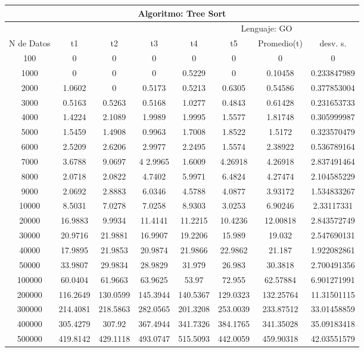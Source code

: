 \documentclass{article}
\begin{document}
	\begin{table}[]
        \begin{tabular}{|c|c|c|c|c|c|c|c| }
            \hline
            \multicolumn{8}{|c|}{Algoritmo: Tree Sort} \\ \hline
            \multicolumn{4}{|c|}{} & \multicolumn{4}{c|}{Lenguaje: GO} \\ \hline
              N de Datos &     t1    &  t2         &  t3          &   t4        &    t5     &   Promedio(t)       & desv. s. \\ \hline
100	    &0	    &0	    &0	        &0	    &0	    &0	      &0              \\ \hline
1000	&0	    &0	    &0	        & 0.5229&0	    &0.10458  &0.233847989     \\ \hline
2000	&1.0602	&0	    & 0.5173	&0.5213	&0.6305	&0.54586  &0.377853004\\ \hline
3000	&0.5163	&0.5263	& 0.5168	&1.0277	&0.4843	&0.61428  &0.231653733\\ \hline
4000	&1.4224	&2.1089	& 1.9989	&1.9995	&1.5577	&1.81748  &0.305999987\\ \hline
5000	&1.5459	&1.4908	& 0.9963	&1.7008	&1.8522	&1.5172	  &0.323570479\\ \hline
6000	&2.5209	&2.6206	& 2.9977	&2.2495	&1.5574	&2.38922  &0.536789164\\ \hline
7000	&3.6788	&9.0697	& 4	2.9965	&1.6009	&4.26918&4.26918    &2.837491464\\ \hline
8000	&2.0718	&2.0822	& 4.7402	&5.9971	&6.4824	&4.27474	&2.104585229\\ \hline
9000	&2.0692	&2.8883	& 6.0346	&4.5788	&4.0877	&3.93172	&1.534833267\\ \hline
10000	&8.5031	&7.0278	& 7.0258	&8.9303	&3.0253	&6.90246	&2.33117331\\ \hline
20000	&16.9883&	9.9934	& 11.4141	&11.2215	&10.4236	&12.00818	&2.843572749\\ \hline
30000	&20.9716&	21.9881	& 16.9907	&19.2206	&15.989	    &19.032	    &2.547690131\\ \hline
40000	&17.9895&	21.9853	& 20.9874	&21.9866	&22.9862	&21.187	    &1.922082861\\ \hline
50000	&33.9807&	29.9834	& 28.9829	&31.979	    &26.983	    &30.3818	&2.700491356\\ \hline
100000	&60.0404&	61.9663	& 63.9625	&53.97	    &72.955	    &62.57884	&6.901271991\\ \hline
200000	&116.2649&	130.0599&	145.3944 &140.5367	&129.0323	&132.25764	&11.31501115\\ \hline
300000	&214.4081&	218.5863&	282.0565 &201.3208	&253.0039	&233.87512	&33.01458859\\ \hline
400000	&305.4279&	307.92	& 367.4944	 &341.7326	&384.1765	&341.35028	&35.09183418\\ \hline
500000	&419.8142&	429.1118&	493.0747 &515.5093	&442.0059	&459.90318  & 42.03551579\\ \hline

    
       \end{tabular}
   \end{table}
		
\end{document}
